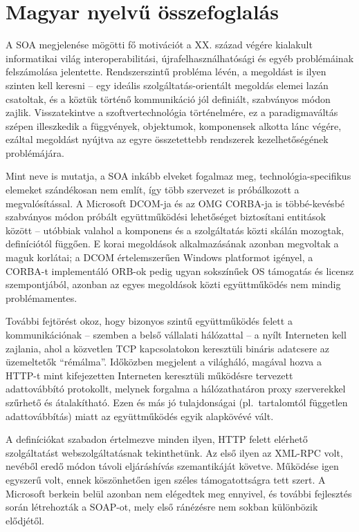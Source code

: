 \chapter*{Magyar nyelvű összefoglalás}

A SOA megjelenése mögötti fő motivációt a XX. század végére kialakult informatikai világ interoperabilitási, újrafelhasználhatósági és egyéb problémáinak felszámolása jelentette. Rendszerszintű probléma lévén, a megoldást is ilyen szinten kell keresni -- egy ideális szolgáltatás-orientált megoldás elemei lazán csatoltak, és a köztük történő kommunikáció jól definiált, szabványos módon zajlik. Visszatekintve a szoftvertechnológia történelmére, ez a paradigmaváltás szépen illeszkedik a függvények, objektumok, komponensek alkotta lánc végére, ezáltal megoldást nyújtva az egyre összetettebb rendszerek kezelhetőségének problémájára.

Mint neve is mutatja, a SOA inkább elveket fogalmaz meg, technológia-specifikus elemeket szándékosan nem említ, így több szervezet is próbálkozott a megvalósítással. A Microsoft DCOM-ja és az OMG CORBA-ja is többé-kevésbé szabványos módon próbált együttműködési lehetőséget biztosítani entitások között -- utóbbiak valahol a komponens és a szolgáltatás közti skálán mozogtak, definíciótól függően. E korai megoldások alkalmazásának azonban megvoltak a maguk korlátai; a DCOM értelemszerűen Windows platformot igényel, a CORBA-t implementáló ORB-ok pedig ugyan sokszínűek OS támogatás és licensz szempontjából, azonban az egyes megoldások közti együttműködés nem mindig problémamentes.

További fejtörést okoz, hogy bizonyos szintű együttműködés felett a kommunikációnak -- szemben a belső vállalati hálózattal -- a nyílt Interneten kell zajlania, ahol a közvetlen TCP kapcsolatokon keresztüli bináris adatcsere az üzemeltetők ``rémálma''. Időközben megjelent a világháló, magával hozva a HTTP-t mint kifejezetten Interneten keresztüli működésre tervezett adattovábbító protokollt, melynek forgalma a hálózathatáron proxy szerverekkel szűrhető és átalakítható. Ezen és más jó tulajdonságai (pl.\ tartalomtól független adattovábbítás) miatt az együttműködés egyik alapkövévé vált.

A definíciókat szabadon értelmezve minden ilyen, HTTP felett elérhető szolgáltatást webszolgáltatásnak tekinthetünk. Az első ilyen az XML-RPC volt, nevéből eredő módon távoli eljáráshívás szemantikáját követve. Működése igen egyszerű volt, ennek köszönhetően igen széles támogatottságra tett szert. A Microsoft berkein belül azonban nem elégedtek meg ennyivel, és további fejlesztés során létrehozták a SOAP-ot, mely első ránézésre nem sokban különbözik elődjétől.

